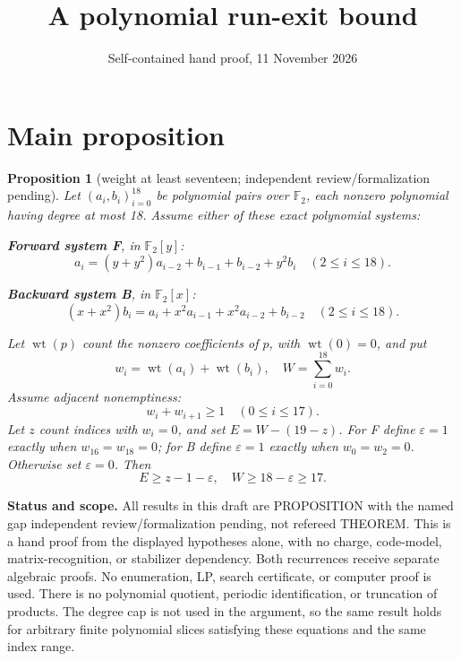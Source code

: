 \documentclass{article}
\title{A polynomial run-exit bound}
\author{}
\date{Self-contained hand proof, 11 November 2026}
\newtheorem*{mainproposition}{Proposition}
\DeclareMathOperator{\wt}{wt}
\begin{document}
\maketitle

\section{Main proposition}\label{sec:main}

\begin{mainproposition}[weight at least seventeen; independent review\slash formalization pending]
  Let \((a_i,b_i)_{i=0}^{18}\) be polynomial pairs over \(\mathbb{F}_2\), each nonzero polynomial
  having degree at most 18. Assume either of these exact polynomial systems:

  \textbf{Forward system F}, in \(\mathbb{F}_2[y]\):
  \begin{equation}\label{eq:forward}
    a_i = (y + y^2) a_{i-2} + b_{i-1} + b_{i-2} + y^2 b_i \quad (2 \le i \le 18).
  \end{equation}

  \textbf{Backward system B}, in \(\mathbb{F}_2[x]\):
  \begin{equation}\label{eq:backward}
    (x + x^2) b_i = a_i + x^2 a_{i-1} + x^2 a_{i-2} + b_{i-2} \quad (2 \le i \le 18).
  \end{equation}

  Let \(\wt(p)\) count the nonzero coefficients of \(p\), with \(\wt(0) = 0\), and put
  \begin{equation}
    w_i = \wt(a_i) + \wt(b_i), \quad W = \sum_{i=0}^{18} w_i.
  \end{equation}
  Assume adjacent nonemptiness:
  \begin{equation}\label{eq:adjacent}
    w_i + w_{i+1} \ge 1 \quad (0 \le i \le 17).
  \end{equation}
  Let \(z\) count indices with \(w_i = 0\), and set \(E = W - (19 - z)\). For F define
  \(\varepsilon = 1\) exactly when \(w_{16} = w_{18} = 0\); for B define \(\varepsilon = 1\) exactly
  when \(w_0 = w_2 = 0\). Otherwise set \(\varepsilon = 0\). Then
  \begin{equation}\label{eq:main-bound}
    E \ge z - 1 - \varepsilon, \quad W \ge 18 - \varepsilon \ge 17.
  \end{equation}
\end{mainproposition}

\textbf{Status and scope.} All results in this draft are PROPOSITION with the named gap
independent review\slash formalization pending, not refereed THEOREM. This is a hand proof from the
displayed hypotheses alone, with no charge, code-model, matrix-recognition, or stabilizer
dependency. Both recurrences receive separate algebraic proofs. No enumeration, LP, search
certificate, or computer proof is used. There is no polynomial quotient, periodic identification,
or truncation of products. The degree cap is not used in the argument, so the same result holds
for arbitrary finite polynomial slices satisfying these equations and the same index range.
\end{document}
